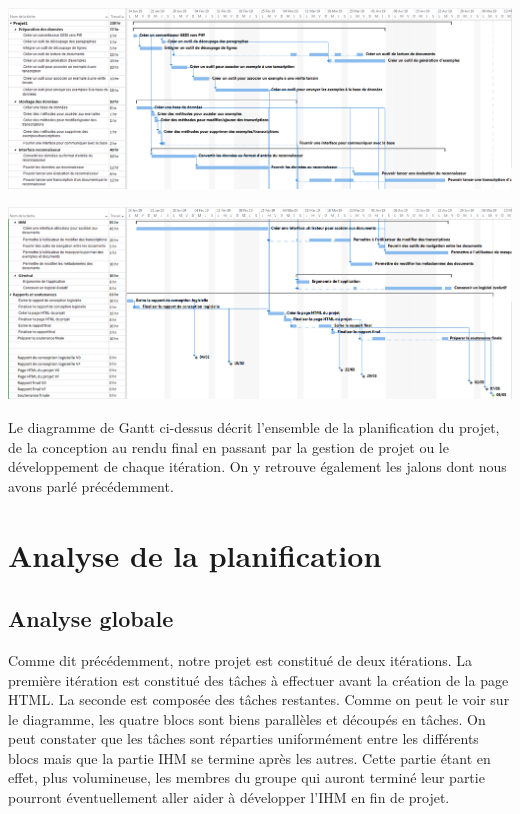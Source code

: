 \begin{mdframed}[frametitle={Figure 3 : Diagramme de Gantt du projet (1/2)}, innerbottommargin=10]
\begin{center}
\includegraphics[scale=0.35]{gantt_V2.1.PNG}
\end{center}
\end{mdframed}

\begin{mdframed}[frametitle={Figure 4 : Diagramme de Gantt du projet (2/2)}, innerbottommargin=10]
\begin{center}
\includegraphics[scale=0.35]{gantt_V2.2.PNG}
\end{center}
\end{mdframed}

Le diagramme de Gantt ci-dessus décrit l’ensemble de la planification du projet, de la conception au rendu final en passant par la gestion de projet ou le développement de chaque itération. On y retrouve également les jalons dont nous avons parlé précédemment.

\newpage

\section{Analyse de la planification}

\subsection{Analyse globale}

Comme dit précédemment, notre projet est constitué de deux itérations. La première itération est constitué des tâches à effectuer avant la création de la page HTML. La seconde est composée des tâches restantes. Comme on peut le voir sur le diagramme, les quatre blocs sont biens parallèles et découpés en tâches. On peut constater que les tâches sont réparties uniformément entre les différents blocs mais que la partie IHM se termine après les autres. Cette partie étant en effet, plus volumineuse, les membres du groupe qui auront terminé leur partie pourront éventuellement aller aider à développer l’IHM en fin  de projet.

